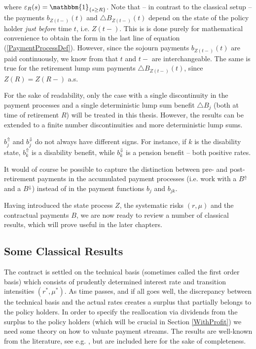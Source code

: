 \documentclass{article}
\newcommand{\1}[1]{\mathbbm{1}_{\left\lbrace #1 \right\rbrace}}
\theoremstyle{break}
\theoremstyle{remark}
\newenvironment{remark}
  {\pushQED{\qed}\renewcommand{\qedsymbol}{\scalebox{1.4}{$\circ$}}\remarkx}
  {\popQED\endremarkx}
\numberwithin{equation}{section}
\begin{document}
where $\varepsilon_{R}(s) = \1{s \geq R}$. Note that -- in contrast to the classical setup -- the payments $b_{Z(t-)}(t)$ and $\triangle B_{Z(t-)}(t)$ depend on the state of the policy holder \textit{just before} time $t$, i.e. $Z(t-)$. This is is done purely for mathematical convenience to obtain the form in the last line of equation (\ref{PaymentProcessDef}). However, since the sojourn payments $b_{Z(t-)}(t)$ are paid continuously, we know from \cite{LivStok} that $t$ and $t-$ are interchangeable. The same is true for the retirement lump sum payments $\triangle B_{Z(t-)}(t)$, since $Z(R) = Z(R-)$ a.s.

\begin{remark}
	For the sake of readability, only the case with a single discontinuity in the payment processes and a single deterministic lump sum benefit $\triangle B_j$ (both at time of retirement $R$) will be treated in this thesis. However, the results can be extended to a finite number discontinuities and more deterministic lump sums.
\end{remark}

\begin{remark}
	$b_j^{\Uparrow}$ and $b_j^{\Downarrow}$ do not always have different signs. For instance, if $k$ is the disability state, $b_k^{\Uparrow}$ is a disability benefit, while $b_k^{\Downarrow}$ is a pension benefit -- both positive rates.
\end{remark}

\begin{remark}
	It would of course be possible to capture the distinction between pre- and post-retirement payments in the accumulated payment processes (i.e. work with a $B^{\Uparrow}$ and a $B^{\Downarrow}$) instead of in the payment functions $b_j$ and $b_{jk}$.
\end{remark}

Having introduced the state process $Z$, the systematic risks $(r,\mu)$ and the contractual payments $B$, we are now ready to review a number of classical results, which will prove useful in the later chapters.

\subsection{Some Classical Results}

The contract is settled on the technical basis (sometimes called the first order basis) which consists of prudently determined interest rate and transition intensities $(r^*,\mu^*)$. As time passes, and if all goes well, the discrepancy between the technical basis and the actual rates creates a surplus that partially belongs to the policy holders. In order to specify the reallocation via dividends from the surplus to the policy holders (which will be crucial in Section \ref{WithProfit}) we need some theory on how to valuate payment streams. The results are well-known from the literature, see e.g. \cite{Norberg1991}, but are included here for the sake of completeness.
\end{document}
